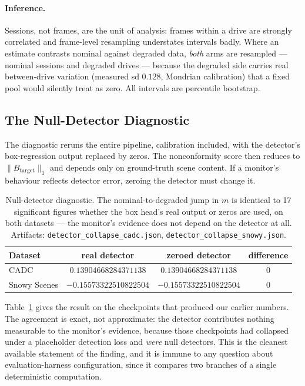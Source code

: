 \paragraph{Inference.} Sessions, not frames, are the unit of analysis:
frames within a drive are strongly correlated and frame-level resampling
understates intervals badly. Where an estimate contrasts nominal against
degraded data, \emph{both} arms are resampled --- nominal sessions and
degraded drives --- because the degraded side carries real between-drive
variation (measured sd $0.128$, Mondrian calibration) that a fixed pool
would silently treat as zero. All intervals are percentile bootstrap.

\subsection{The Null-Detector Diagnostic}
\label{sec:null-diagnostic}

The diagnostic reruns the entire pipeline, calibration included, with the
detector's box-regression output replaced by zeros. The nonconformity score
then reduces to $\lVert B_{\mathrm{target}} \rVert_1$ and depends only on
ground-truth scene content. If a monitor's behaviour reflects detector
error, zeroing the detector must change it.

\begin{table}[t]
\centering
\caption{Null-detector diagnostic. The nominal-to-degraded jump in $m$ is
identical to 17 significant figures whether the box head's real output or
zeros are used, on both datasets --- the monitor's evidence does not depend
on the detector at all. Artifacts:
\texttt{detector\_collapse\_cadc.json},
\texttt{detector\_collapse\_snowy.json}.}
\label{tab:null-diagnostic}
\begin{tabular}{@{}lccc@{}}
\toprule
Dataset & real detector & zeroed detector & difference \\
\midrule
CADC & $0.13904668284371138$ & $0.13904668284371138$ & $0$ \\
Snowy Scenes & $-0.15573322510822504$ & $-0.15573322510822504$ & $0$ \\
\bottomrule
\end{tabular}
\end{table}

Table~\ref{tab:null-diagnostic} gives the result on the checkpoints that
produced our earlier numbers. The agreement is exact, not approximate: the
detector contributes nothing measurable to the monitor's evidence, because
those checkpoints had collapsed under a placeholder detection loss and
\emph{were} null detectors. This is the cleanest available statement of the
finding, and it is immune to any question about evaluation-harness
configuration, since it compares two branches of a single deterministic
computation.

